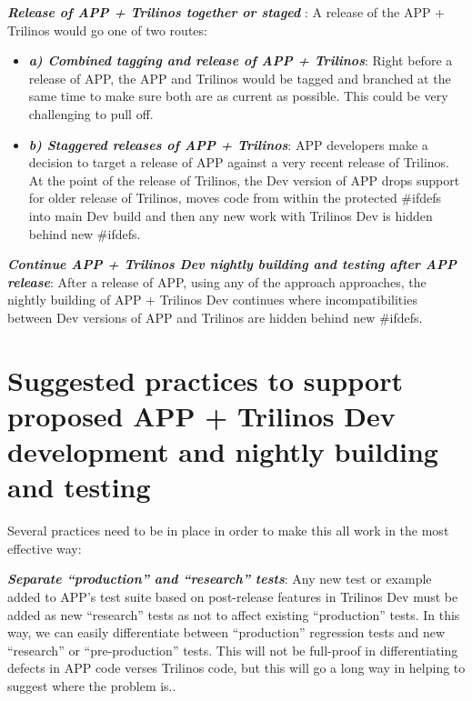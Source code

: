 \documentclass[pdf,ps2pdf,11pt]{SANDreport}
\begin{document}
{}\textit{\textbf{Release of APP + Trilinos together or staged }}: A release
of the APP + Trilinos would go one of two routes:

    \begin{itemize}

    {}\item\textit{\textbf{a) Combined tagging and release of APP +
    Trilinos}}: Right before a release of APP, the APP and Trilinos would be
    tagged and branched at the same time to make sure both are as current as
    possible.  This could be very challenging to pull off.

    {}\item\textit{\textbf{b) Staggered releases of APP + Trilinos}}: APP
    developers make a decision to target a release of APP against a very
    recent release of Trilinos.  At the point of the release of Trilinos, the
    Dev version of APP drops support for older release of Trilinos, moves code
    from within the protected {}\#ifdefs into main Dev build and then any new
    work with Trilinos Dev is hidden behind new {}\#ifdefs.

    \end{itemize}

{}\textit{\textbf{Continue APP + Trilinos Dev nightly building and testing after
APP release}}: After a release of APP, using any of the approach approaches,
the nightly building of APP + Trilinos Dev continues where incompatibilities
between Dev versions of APP and Trilinos are hidden behind new {}\#ifdefs.


%
{}\section{Suggested practices to support proposed APP + Trilinos Dev
development and nightly building and testing}
%

Several practices need to be in place in order to make this all work in the
most effective way:

{}\textit{\textbf{Separate ``production'' and ``research'' tests}}: Any new
test or example added to APP's test suite based on post-release features in
Trilinos Dev must be added as new ``research'' tests as not to affect existing
``production'' tests.  In this way, we can easily differentiate between
``production'' regression tests and new ``research'' or ``pre-production'' tests.
This will not be full-proof in differentiating defects in APP code verses
Trilinos code, but this will go a long way in helping to suggest where the
problem is..
\end{document}
